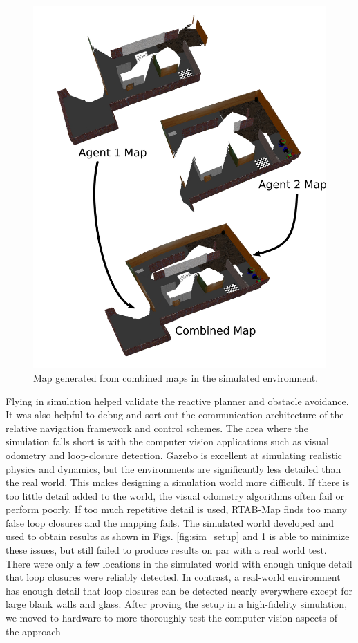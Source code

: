 \documentclass[letterpaper, 10 pt, conference]{ieeeconf}  %
\begin{document}
\begin{figure}
\centering
\includegraphics[width=0.7\linewidth]{sim_map}
\caption{Map generated from combined maps in the simulated environment.}
\label{fig:sim_map}
\end{figure}

Flying in simulation helped validate the reactive planner and obstacle avoidance. It was also helpful to debug and sort out the communication architecture of the relative navigation framework and control schemes. The area where the simulation falls short is with the computer vision applications such as visual odometry and loop-closure detection. Gazebo is excellent at simulating realistic physics and dynamics, but the environments are significantly less detailed than the real world. This makes designing a simulation world more difficult. If there is too little detail added to the world, the visual odometry algorithms often fail or perform poorly. If too much repetitive detail is used, RTAB-Map finds too many false loop closures and the mapping fails. The simulated world developed and used to obtain results as shown in Figs. \ref{fig:sim_setup} and \ref{fig:sim_map} is able to minimize these issues, but still failed to produce results on par with a real world test. There were only a few locations in the simulated world with enough unique detail that loop closures were reliably detected. In contrast, a real-world environment has enough detail that loop closures can be detected nearly everywhere except for large blank walls and glass. After proving the setup in a high-fidelity simulation, we moved to hardware to more thoroughly test the computer vision aspects of the approach
\end{document}
